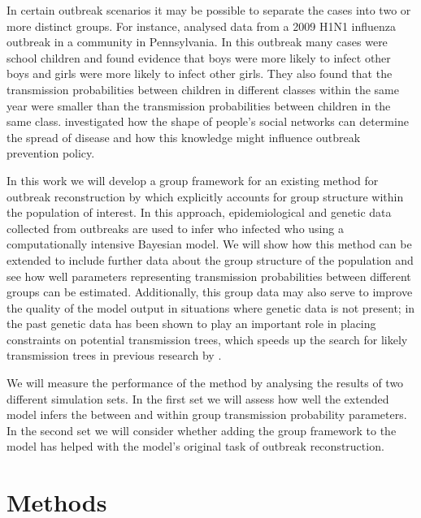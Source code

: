 \documentclass[11pt,a4paper]{report}
\begin{document}
In certain outbreak scenarios it may be possible to separate the cases into two or more distinct groups. For instance, \citet{Cauchemez11} analysed data from a 2009 H1N1 influenza outbreak in a community in Pennsylvania. In this outbreak many cases were school children and \citet{Cauchemez11} found evidence that boys were more likely to infect other boys and girls were more likely to infect other girls. They also found that the transmission probabilities between children in different classes within the same year were smaller than the transmission probabilities between children in the same class. \citet{Eubank04} investigated how the shape of people's social networks can determine the spread of disease and how this knowledge might influence outbreak prevention policy.

In this work we will develop a group framework for an existing method for outbreak reconstruction by \citet{outbrkr} which explicitly accounts for group structure within the population of interest. In this approach, epidemiological and genetic data collected from outbreaks are used to infer who infected who using a computationally intensive Bayesian model. We will show how this method can be extended to include further data about the group structure of the population and see how well parameters representing transmission probabilities between different groups can be estimated. Additionally, this group data may also serve to improve the quality of the model output in situations where genetic data is not present; in the past genetic data has been shown to play an important role in placing constraints on potential transmission trees, which speeds up the search for likely transmission trees in previous research by \citet{outbrkr}. 

We will measure the performance of the method by analysing the results of two different simulation sets. In the first set we will assess how well the extended model infers the between and within group transmission probability parameters. In the second set we will consider whether adding the group framework to the model has helped with the model's original task of outbreak reconstruction. 


\chapter{Methods}
\end{document}
